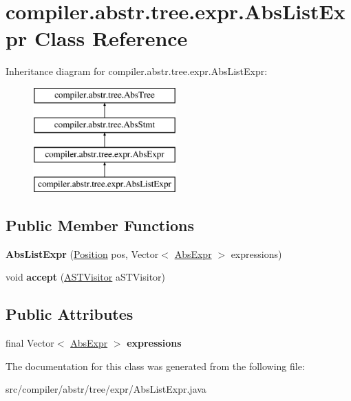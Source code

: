 \hypertarget{classcompiler_1_1abstr_1_1tree_1_1expr_1_1_abs_list_expr}{}\section{compiler.\+abstr.\+tree.\+expr.\+Abs\+List\+Expr Class Reference}
\label{classcompiler_1_1abstr_1_1tree_1_1expr_1_1_abs_list_expr}
Inheritance diagram for compiler.\+abstr.\+tree.\+expr.\+Abs\+List\+Expr\+:\begin{figure}[H]
\begin{center}
\leavevmode
\includegraphics[height=4.000000cm]{classcompiler_1_1abstr_1_1tree_1_1expr_1_1_abs_list_expr}
\end{center}
\end{figure}
\subsection*{Public Member Functions}
\begin{DoxyCompactItemize}
\item 
\mbox{\label{classcompiler_1_1abstr_1_1tree_1_1expr_1_1_abs_list_expr_a06a6a5911116bef68462fc117ab5a70d}} 
{\bfseries Abs\+List\+Expr} (\hyperlink{classcompiler_1_1_position}{Position} pos, Vector$<$ \hyperlink{classcompiler_1_1abstr_1_1tree_1_1expr_1_1_abs_expr}{Abs\+Expr} $>$ expressions)
\item 
\mbox{\label{classcompiler_1_1abstr_1_1tree_1_1expr_1_1_abs_list_expr_abbc8859397f397832531a72b44b4ca11}} 
void {\bfseries accept} (\hyperlink{interfacecompiler_1_1abstr_1_1_a_s_t_visitor}{A\+S\+T\+Visitor} a\+S\+T\+Visitor)
\end{DoxyCompactItemize}
\subsection*{Public Attributes}
\begin{DoxyCompactItemize}
\item 
\mbox{\label{classcompiler_1_1abstr_1_1tree_1_1expr_1_1_abs_list_expr_abb7b91a502cbefbdff05ed0a16c9ce2a}} 
final Vector$<$ \hyperlink{classcompiler_1_1abstr_1_1tree_1_1expr_1_1_abs_expr}{Abs\+Expr} $>$ {\bfseries expressions}
\end{DoxyCompactItemize}


The documentation for this class was generated from the following file\+:\begin{DoxyCompactItemize}
\item 
src/compiler/abstr/tree/expr/Abs\+List\+Expr.\+java\end{DoxyCompactItemize}
